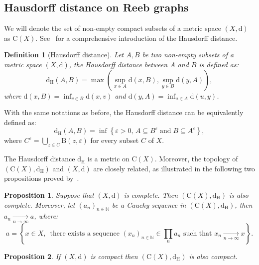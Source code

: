 \documentclass[pdflatex,sn-mathphys-ay]{sn-jnl}%
\newtheorem{definition}{Definition}
\newtheorem{proposition}{Proposition}[section]
\newcommand{\spa}{X}
\newcommand{\dis}{\mathrm{d}}
\newcommand{\comp}{{\mathrm {C}}}
\newcommand{\haus}{{\mathrm {d_H}}}
\newcommand{\ball}{{\mathrm {B}}}
\newcommand{\converge}{\underset{n\rightarrow\infty}{\longrightarrow}}
\newcommand{\N}{\mathbb{N}}
\newcommand{\eps}{\varepsilon}
\newcommand{\change}[1]{\noindent #1}
\theoremstyle{thmstyleone}%
\begin{document}
\subsection{Hausdorff distance on Reeb graphs}

We will denote the set of non-empty compact subsets of a metric space $(\spa,\dis)$ as $\comp(\spa)$.  See~\citet{henrikson1999completeness} for a comprehensive introduction of the Hausdorff distance. 

\begin{definition}[\change{Hausdorff distance}]
 Let $A,B$ be two non-empty subsets of a metric space $(\spa,\dis)$, the Hausdorff distance between $A$ and $B$ is defined as:
 $$\haus(A,B)=\max\left(\sup_{x\in A}\dis(x,B),\sup_{y\in B}\dis(y,A)\right),$$
 where $\dis(x,B)=\inf_{v\in B}\dis(x,v)$ and $\dis(y,A)=\inf_{u\in A}\dis(u,y)$.
\end{definition}
With the same notations as before,  
the Hausdorff distance
can be equivalently defined as:
$$\haus(A,B)=\inf\left\{\eps>0,\,A\subseteq B^\eps\;\mathrm{ and }\;B\subseteq A^\eps\right\},$$
where $C^\eps=\bigcup_{z\in C}\ball(z,\eps)$ for every subset $C$ of $X$.

The Hausdorff distance 
$\haus$ is a metric on $\comp(\spa)$. Moreover, the topology of $(\comp(\spa),\haus)$ and $(\spa,\dis)$ are closely related, as illustrated in the following two propositions proved by~\citet{henrikson1999completeness}.

\begin{proposition}\label{prop:haus_limit}
Suppose that $(\spa,\dis)$ is complete. Then $(\comp(\spa),\haus)$ is also complete. Moreover, let $(a_n)_{n\in\N}$ be a Cauchy sequence in $(\comp(\spa),\haus)$, then $a_n\converge a$, where:
$$a=\left\{x \in \spa, \, \textrm{ there exists a sequence } (x_n)_{n\in\N}  \in \prod_n a_n  \textrm{ such that } x_n \converge x \right\}.$$
\end{proposition}

\begin{proposition}
If $(\spa,\dis)$ is compact then $(\comp(\spa),\haus)$ is also compact.
\end{proposition}
\end{document}
